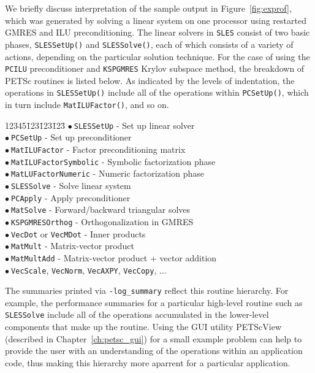 We briefly discuss interpretation of the sample output in
Figure~\ref{fig:exprof}, which was generated by solving a linear
system on one processor using restarted GMRES and ILU
preconditioning.  The linear solvers in {\tt SLES} consist of two
basic phases, {\tt SLESSetUp()} and {\tt SLESSolve()}, each of which
consists of a variety of actions, depending on the particular
solution technique.
For the case of using the {\tt PCILU} preconditioner and {\tt KSPGMRES}
Krylov subspace method, the breakdown of PETSc routines is listed below.
As indicated by the levels of indentation, the
operations in {\tt SLESSetUp()} include all of the operations within
{\tt PCSetUp()}, which in turn include {\tt MatILUFactor()}, and so on. 
\newcommand{\bu}{$\bullet \: $}
\begin{tabbing}
12345\=123\=123\=123\= \kill
\> \bu {\tt SLESSetUp} - Set up linear solver\\
\>\> \bu {\tt PCSetUp} - Set up preconditioner\\
\>\>\> \bu {\tt MatILUFactor} - Factor preconditioning matrix\\
\>\>\>\> \bu {\tt MatILUFactorSymbolic} - Symbolic factorization phase\\
\>\>\>\> \bu {\tt MatLUFactorNumeric} - Numeric factorization phase\\
\> \bu {\tt SLESSolve} - Solve linear system\\
\>\> \bu {\tt PCApply} - Apply preconditioner\\
\>\>\> \bu {\tt MatSolve} - Forward/backward triangular solves\\
\>\> \bu {\tt KSPGMRESOrthog} - Orthogonalization in GMRES\\
\>\>\> \bu {\tt VecDot} or {\tt VecMDot} - Inner products\\
\>\> \bu {\tt MatMult} - Matrix-vector product\\
\>\> \bu {\tt MatMultAdd} - Matrix-vector product + vector addition\\
\>\> \bu  {\tt VecScale}, {\tt VecNorm}, {\tt VecAXPY}, {\tt VecCopy}, ...\\
\end{tabbing}

The summaries printed via {\tt -log\_summary} reflect this 
routine hierarchy. For example, the performance summaries for a
particular high-level routine such as {\tt SLESSolve} include all of
the operations accumulated in the lower-level components that
make up the routine.  Using the GUI utility PETScView
(described in Chapter~\ref{ch:petsc_gui}) for a small example problem can
help to provide the user with an understanding of the operations
within an application code, thus making this hierarchy more aparrent
for a particular application.

